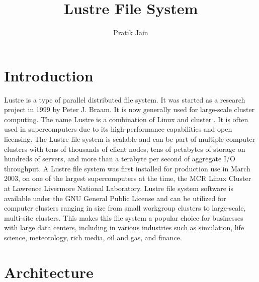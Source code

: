 \documentclass[9pt,twocolumn,twoside]{../../styles/osajnl}
\title{Lustre File System}
\author{Pratik Jain}
\affil{School of Informatics and Computing, Bloomington, IN 47408, U.S.A.}
\affil{Corresponding authors: jainps@iu.edu}
\begin{document}
\maketitle

\section{Introduction}

Lustre is a type of parallel distributed file system. It was started
as a research project in 1999 by Peter J. Braam. It is now generally
used for large-scale cluster computing. The name Lustre is a
combination of Linux and cluster \cite{www-ungrid}. It is often used
in supercomputers due to its high-performance capabilities and open
licensing. The Lustre file system is scalable and can be part of
multiple computer clusters with tens of thousands of client nodes,
tens of petabytes of storage on hundreds of servers, and more than a
terabyte per second of aggregate I/O throughput.  A Lustre file system
was first installed for production use in March 2003, on one of the
largest supercomputers at the time, the MCR Linux Cluster at Lawrence
Livermore National Laboratory. Lustre file system software is
available under the GNU General Public License and can be utilized for
computer clusters ranging in size from small workgroup clusters to
large-scale, multi-site clusters. This makes this file system a
popular choice for businesses with large data centers, including in
various industries such as simulation, life science, meteorology, rich
media, oil and gas, and finance.

\section{Architecture}
\end{document}
